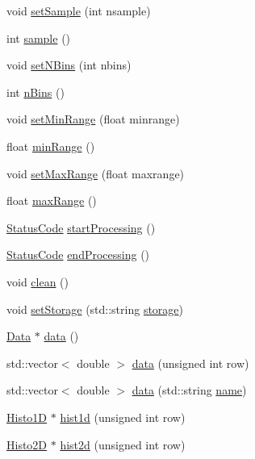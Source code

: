 \begin{DoxyCompactItemize}
void \hyperlink{classAcquisition_ade6fd6483b3e3737fe7dcdffb5065954}{set\+Sample} (int nsample)
\item 
int \hyperlink{classAcquisition_a83181975c0746e5837d53933031e7b62}{sample} ()
\item 
void \hyperlink{classAcquisition_a6ee040a009aa48f848b1e12434135db9}{set\+N\+Bins} (int nbins)
\item 
int \hyperlink{classAcquisition_a3a3dad0de9535d5a29c0810a5bdc3ae3}{n\+Bins} ()
\item 
void \hyperlink{classAcquisition_a8a15ffc6e539a3ae12efe4bea1ca7587}{set\+Min\+Range} (float minrange)
\item 
float \hyperlink{classAcquisition_a44f441710231748d2ca8f691647b2bcd}{min\+Range} ()
\item 
void \hyperlink{classAcquisition_a786da6cff5428020034be23e554e0e1b}{set\+Max\+Range} (float maxrange)
\item 
float \hyperlink{classAcquisition_a386f3ebc6b1d4956aa7e40b314ddb4eb}{max\+Range} ()
\item 
\hyperlink{classStatusCode}{Status\+Code} \hyperlink{classProcessus_a09319bde9bed93e290f69b4e04585543}{start\+Processing} ()
\item 
\hyperlink{classStatusCode}{Status\+Code} \hyperlink{classProcessus_a5e4da662989d356b89d490b89c7afbfd}{end\+Processing} ()
\item 
void \hyperlink{classProcessus_aaeb17673b98d2b39f3aa780e335e0968}{clean} ()
\item 
void \hyperlink{classProcessus_ad57a29b33f9021eda9f6929136f1784f}{set\+Storage} (std\+::string \hyperlink{classProcessus_a33fa1a0b54a636e5cdd680669fd9ea51}{storage})
\item 
\hyperlink{classData}{Data} $\ast$ \hyperlink{classProcessus_a16e45f329fbce935aeef0ff3cb508228}{data} ()
\item 
std\+::vector$<$ double $>$ \hyperlink{classProcessus_aa7c57483cf4b9ab0b2d0ae2de8316402}{data} (unsigned int row)
\item 
std\+::vector$<$ double $>$ \hyperlink{classProcessus_abf4d91fb36707e1d50178bab12d21ae9}{data} (std\+::string \hyperlink{classObject_a300f4c05dd468c7bb8b3c968868443c1}{name})
\item 
\hyperlink{classHisto1D}{Histo1D} $\ast$ \hyperlink{classProcessus_a409227db936baff03c0462c1bcfe8069}{hist1d} (unsigned int row)
\item 
\hyperlink{classHisto2D}{Histo2D} $\ast$ \hyperlink{classProcessus_a73b5118cb5f2b5eaad33286183b86cfc}{hist2d} (unsigned int row)

\end{DoxyCompactItemize}
